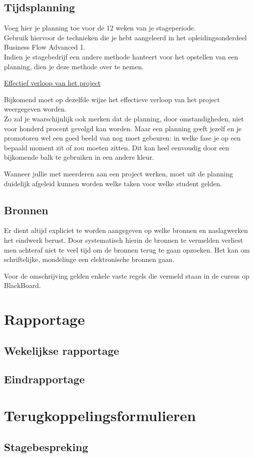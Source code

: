 \documentclass[a4paper]{article}
\begin{document}
    \newpage

  \subsection{Tijdsplanning}
    Voeg hier je planning toe voor de 12 weken van je stageperiode.\\
    Gebruik hiervoor de technieken die je hebt aangeleerd in het opleidingsonderdeel
    Business Flow Advanced 1.\\
    Indien je stagebedrijf een andere methode hanteert voor het opstellen van een
    planning, dien je deze methode over te nemen.\par
    \underline{Effectief verloop van het project}\par
    Bijkomend moet op dezelfde wijze het effectieve verloop van het project
    weergegeven worden.\\
    Zo zal je waarschijnlijk ook merken dat de planning, door omstandigheden, niet voor
    honderd procent gevolgd kan worden. Maar een planning geeft jezelf en je promotoren
    wel een goed beeld van nog moet gebeuren: in welke fase je op een bepaald moment zit
    of zou moeten zitten. Dit kan heel eenvoudig door een bijkomende balk te gebruiken in
    een andere kleur.\par
    Wanneer jullie met meerderen aan een project werken, moet uit de planning
    duidelijk afgeleid kunnen worden welke taken voor welke student gelden.

  \subsection{Bronnen}
    Er dient altijd expliciet te worden aangegeven op welke bronnen en naslagwerken
    het eindwerk berust. Door systematisch hierin de bronnen te vermelden verliest
    men achteraf niet te veel tijd om de bronnen terug te gaan opzoeken. Het kan
    om schriftelijke, mondelinge een elektronische bronnen gaan.\par
    Voor de omschrijving gelden enkele vaste regels die vermeld staan in de
    cursus op BlackBoard.
  \section{Rapportage}
  \subsection{Wekelijkse rapportage}
  \subsection{Eindrapportage}
  \section{Terugkoppelingsformulieren}
  \subsection{Stagebespreking}
\end{document}
